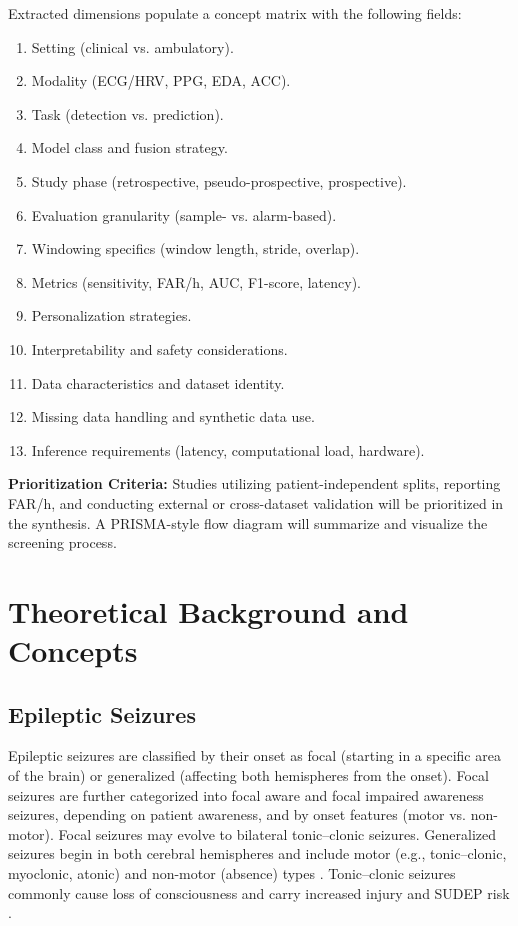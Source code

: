 Extracted dimensions populate a concept matrix with the following
fields:
\begin{enumerate}
  \item Setting (clinical vs. ambulatory).
  \item Modality (ECG/HRV, PPG, EDA, ACC).
  \item Task (detection vs. prediction).
  \item Model class and fusion strategy.
  \item Study phase (retrospective, pseudo-prospective, prospective).
  \item Evaluation granularity (sample- vs. alarm-based).
  \item Windowing specifics (window length, stride, overlap).
  \item Metrics (sensitivity, FAR/h, AUC, F1-score, latency).
  \item Personalization strategies.
  \item Interpretability and safety considerations.
  \item Data characteristics and dataset identity.
  \item Missing data handling and synthetic data use.
  \item Inference requirements (latency, computational load,
    hardware).
\end{enumerate}

\noindent\textbf{Prioritization Criteria:}
Studies utilizing patient-independent splits, reporting FAR/h, and
conducting external or cross-dataset validation will be prioritized in
the synthesis. A PRISMA-style flow diagram will summarize and visualize
the screening process.

\section{Theoretical Background and Concepts}

\subsection{Epileptic Seizures}
Epileptic seizures are classified by their onset as focal (starting in
a specific area of the brain) or generalized (affecting both
hemispheres from the onset). Focal seizures are further categorized
into focal aware and focal impaired awareness seizures, depending on
patient awareness, and by onset features (motor vs. non-motor). Focal
seizures may evolve to bilateral tonic–clonic seizures. Generalized
seizures begin in both cerebral hemispheres and include motor (e.g.,
tonic–clonic, myoclonic, atonic) and non-motor (absence) types
\parencite{fisherInstructionManualILAE2017}. Tonic–clonic seizures
commonly cause loss of consciousness and carry increased injury and
SUDEP risk \parencite{hesdorfferCombinedAnalysisRisk2011}.

